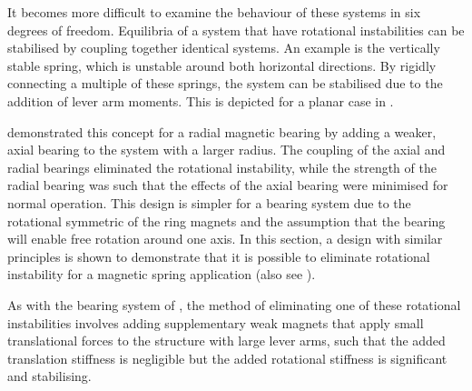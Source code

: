 \documentclass[11pt,a4paper]{memoir}
\begin{document}
It becomes more difficult to examine the behaviour of these systems in six degrees of freedom.
Equilibria of a system that have rotational instabilities can be stabilised by coupling together identical systems.
An example is the vertically stable spring, which is unstable around both horizontal directions.
By rigidly connecting a multiple of these springs, the system can be stabilised due to the addition of lever arm moments.
This is depicted for a planar case in .

\begin{figure}
\end{figure}

\textcite{delamare1994-ietm} demonstrated this concept for a radial magnetic bearing by adding a weaker, axial bearing to the system with a larger radius.
The coupling of the axial and radial bearings eliminated the rotational instability, while the strength of the radial bearing was such that the effects of the axial bearing were minimised for normal operation.
This design is simpler for a bearing system due to the rotational symmetric of the ring magnets and the assumption that the bearing will enable free rotation around one axis.
In this section, a design with similar principles is shown to demonstrate that it is possible to eliminate rotational instability for a magnetic spring application (also see ).

As with the bearing system of \textcite{delamare1994-ietm}, the method of eliminating one of these rotational instabilities involves adding supplementary weak magnets that apply small translational forces to the structure with large lever arms, such that the added translation stiffness is negligible but the added rotational stiffness is significant and stabilising.
\end{document}
